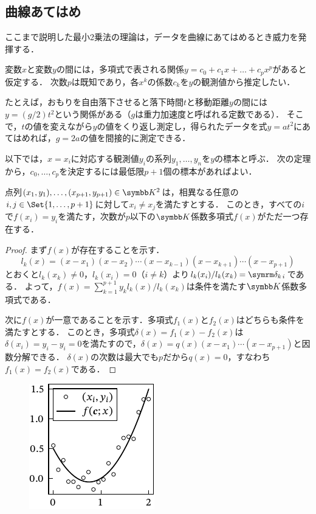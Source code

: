 \documentclass[../../main]{subfiles}
\begin{document}
\subsection{曲線あてはめ}
\label{subsection:curve_fitting}

ここまで説明した最小2乗法の理論は，データを曲線にあてはめるとき威力を発揮する．

変数\(x\)と変数\(y\)の間には，多項式で表される関係\(y=c_0+c_1x+\dots+c_px^p\)があると仮定する．
次数\(p\)は既知であり，各\(x^k\)の係数\(c_k\)を\(y\)の観測値から推定したい．

たとえば，おもりを自由落下させると落下時間\(t\)と移動距離\(y\)の間には\(y=(g/2)t^2\)という関係がある（\(g\)は重力加速度と呼ばれる定数である）．
そこで，\(t\)の値を変えながら\(y\)の値をくり返し測定し，得られたデータを式\(y=at^2\)にあてはめれば，\(g=2a\)の値を間接的に測定できる．

以下では，\(x=x_i\)に対応する観測値\(y_i\)の系列\(y_1,\dots,y_n\)を\(y\)の標本と呼ぶ．
次の定理から，\(c_0,\dots,c_p\)を決定するには最低限\(p+1\)個の標本があればよい．

\begin{theorem}{}{}
  点列\((x_1,y_1),\dots,(x_{p+1},y_{p+1})\in\numset{K}^2\)は，相異なる任意の\(i,j\in\Set{1,\dots,p+1}\)に対して\(x_i\neq x_j\)を満たすとする．
  このとき，すべての\(i\)で\(f(x_i)=y_i\)を満たす，次数が\(p\)以下の\(\numset{K}\)係数多項式\(f(x)\)がただ一つ存在する\footnotemark ．
\end{theorem}

\begin{proof}
  まず\(f(x)\)が存在することを示す．
  \[
    l_k(x) = (x-x_1)(x-x_2)\dotsm(x-x_{k-1})(x-x_{k+1})\dotsm(x-x_{p+1})
  \]
  とおくと\(l_k(x_k)\neq 0\)，\(l_k(x_i)=0\)（\(i\neq k\)）より\(l_k(x_i)/l_k(x_k)=\kdelta{k}{i}\)である．
  よって，\(f(x)=\sum_{k=1}^{p+1}y_kl_k(x)/l_k(x_k)\)は条件を満たす\(\numset{K}\)係数多項式である．

  次に\(f(x)\)が一意であることを示す．多項式\(f_1(x)\)と\(f_2(x)\)はどちらも条件を満たすとする．
  このとき，多項式\(\delta(x)=f_1(x)-f_2(x)\)は\(\delta(x_i)=y_i-y_i=0\)を満たすので，\(\delta(x)=q(x)(x-x_1)\dotsm(x-x_{p+1})\)と因数分解できる．
  \(\delta(x)\)の次数は最大でも\(p\)だから\(q(x)=0\)，すなわち\(f_1(x)=f_2(x)\)である．
\end{proof}

\begin{figure}
  \includegraphics{figures/regression.pdf}
\end{figure}
\end{document}
